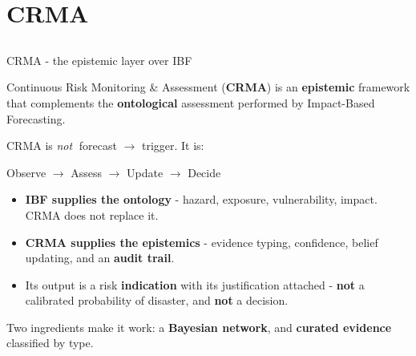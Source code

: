 \documentclass[aspectratio=3218]{beamer}
\begin{document}
\section{CRMA}
\subsection*{}

\begin{frame}{CRMA - the epistemic layer over IBF}
	\begin{block}{}
		\centering
		Continuous Risk Monitoring \& Assessment (\textbf{CRMA}) is an
		\textbf{epistemic} framework that complements the \textbf{ontological}
		assessment performed by Impact-Based Forecasting.
	\end{block}
	CRMA is \emph{not} $\;$forecast $\rightarrow$ trigger. It is:
	\begin{block}{}
		\centering\Large
		Observe $\rightarrow$ Assess $\rightarrow$ Update $\rightarrow$ Decide
	\end{block}
	\begin{itemize}
		\item \textbf{IBF supplies the ontology} - hazard, exposure,
			vulnerability, impact. CRMA does not replace it.
		\item \textbf{CRMA supplies the epistemics} - evidence typing,
			confidence, belief updating, and an \textbf{audit trail}.
		\item Its output is a risk \textbf{indication} with its justification
			attached - \textbf{not} a calibrated probability of disaster, and
			\textbf{not} a decision.
	\end{itemize}
	\centering\footnotesize
	Two ingredients make it work: a \textbf{Bayesian network}, and
	\textbf{curated evidence} classified by type.
\end{frame}
\end{document}

